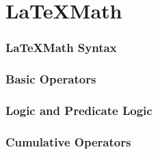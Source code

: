 \section{\LaTeX Math}
    \begin{frame}
        \frametitle{\LaTeX  Math Syntax}
    \end{frame}

    \begin{frame}
        \frametitle{Basic Operators}
    \end{frame}

    \begin{frame}
        \frametitle{Logic and Predicate Logic}
    \end{frame}

    \begin{frame}
        \frametitle{Cumulative Operators}
    \end{frame}
